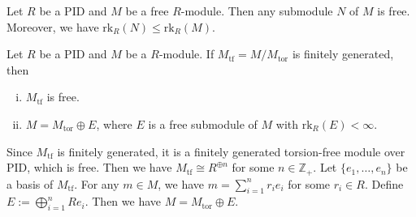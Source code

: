 \begin{proposition}{}{}
    Let $R$ be a PID and $M$ be a free $R$-module. Then any submodule $N$ of $M$ is free. Moreover, we have $\mathrm{rk}_R(N)\le \mathrm{rk}_R(M)$.
\end{proposition}

\begin{proposition}{}{}
    Let $R$ be a PID and $M$ be a $R$-module. If $M_{\mathrm{tf}}=M/M_{\mathrm{tor}}$ is finitely generated, then 
    \begin{enumerate}[(i)]
        \item $M_{\mathrm{tf}}$ is free.
        \item $M=M_{\mathrm{tor}}\oplus E$, where $E$ is a free submodule of $M$ with $\mathrm{rk}_R(E)<\infty$.
    \end{enumerate}
\end{proposition}
\begin{prf}
    Since $M_{\mathrm{tf}}$ is finitely generated, it is a finitely generated torsion-free module over PID, which is free. Then we have $M_{\mathrm{tf}}\cong R^{\oplus n}$ for some $n\in \mathbb{Z}_+$. Let $\{e_1, \ldots, e_n\}$ be a basis of $M_{\mathrm{tf}}$. For any $m\in M$, we have $m=\sum_{i=1}^n r_i e_i$ for some $r_i\in R$. Define $E:=\bigoplus_{i=1}^n Re_i$. Then we have $M=M_{\mathrm{tor}}\oplus E$.
\end{prf}

